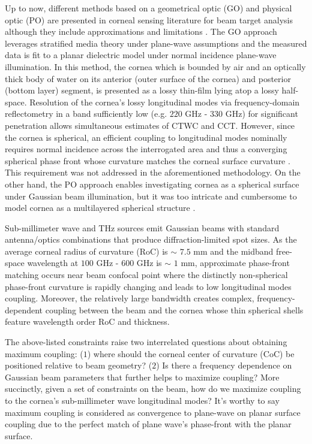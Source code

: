 \documentclass{osa-article}
\begin{document}
Up to now, different methods based on a geometrical optic (GO) and physical optic (PO) are presented in corneal sensing literature for beam target analysis although they include approximations and limitations \cite{quasi}. The GO approach leverages stratified media theory under plane-wave assumptions and the measured data is fit to a planar dielectric model under normal incidence plane-wave illumination. In this method, the cornea which is bounded by air and an optically thick body of water on its anterior (outer surface of the cornea) and posterior (bottom layer) segment, is presented as a lossy thin-film lying atop a lossy half-space. Resolution of the cornea’s lossy longitudinal modes via frequency-domain reflectometry in a band sufficiently low (e.g. $220$ GHz - $330$ GHz) for significant penetration allows simultaneous estimates of CTWC and CCT. However, since the cornea is spherical, an efficient coupling to longitudinal modes nominally requires normal incidence across the interrogated area and thus a converging spherical phase front whose curvature matches the corneal surface curvature \cite{zach2015e, zach2015t, zach2018e, zach2018t}. This requirement was not addressed in the aforementioned methodology. On the other hand, the PO approach enables investigating cornea as a spherical surface under Gaussian beam illumination, but it was too intricate and cumbersome to model cornea as a multilayered spherical structure \cite{quasi}.

Sub-millimeter wave and THz sources emit Gaussian beams with standard antenna/optics combinations that produce diffraction-limited spot sizes. As the average corneal radius of curvature (RoC) is $\sim$ $7.5$ mm and the midband free-space wavelength at $100$ GHz - $600$ GHz is $\sim$ $1$ mm, approximate phase-front matching occurs near beam confocal point where the distinctly non-spherical phase-front curvature is rapidly changing and leads to low longitudinal modes coupling. Moreover, the relatively large bandwidth creates complex, frequency-dependent coupling between the beam and the cornea whose thin spherical shells feature wavelength order RoC and thickness.

 The above-listed constraints raise two interrelated questions about obtaining maximum coupling: ($1$) where should the corneal center of curvature (CoC) be positioned relative to beam geometry? ($2$) Is there a frequency dependence on Gaussian beam parameters that further helps to maximize coupling? More succinctly, given a set of constraints on the beam, how do we maximize coupling to the cornea’s sub-millimeter wave longitudinal modes? It's worthy to say maximum coupling is considered as convergence to plane-wave on planar surface coupling due to the perfect match of plane wave's phase-front with the planar surface.
\end{document}
